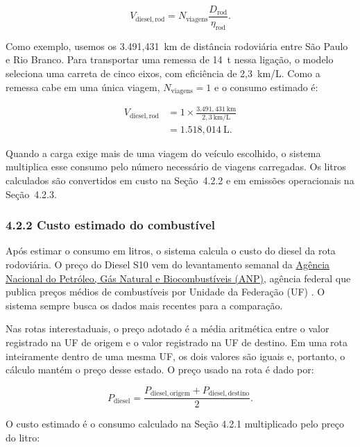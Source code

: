 \documentclass[brazil,]{article}
\let\oldsubsubsection\subsubsection
\renewcommand{\subsubsection}{\Needspace{10\baselineskip}\oldsubsubsection}
\newcommand{\keepcalculation}{\Needspace{12\baselineskip}}
\begin{document}
\[
V_{\mathrm{diesel,rod}}
=N_{\mathrm{viagens}}\frac{D_{\mathrm{rod}}}{\eta_{\mathrm{rod}}}.
\]

\keepcalculation
Como exemplo, usemos os 3.491,431~km de distância rodoviária entre São
Paulo e Rio Branco. Para transportar uma remessa de 14~t nessa ligação,
o modelo seleciona uma carreta de cinco eixos, com eficiência de
2,3~km/L. Como a remessa cabe em uma única viagem,
\(N_{\mathrm{viagens}}=1\) e o consumo estimado é:

\[
\begin{aligned}
V_{\mathrm{diesel,rod}}
&=1\times\frac{3.491{,}431\ \mathrm{km}}{2{,}3\ \mathrm{km/L}}\\
&=1.518{,}014\ \mathrm{L}.
\end{aligned}
\]

Quando a carga exige mais de uma viagem do veículo escolhido, o sistema
multiplica esse consumo pelo número necessário de viagens carregadas. Os
litros calculados são convertidos em custo na Seção~4.2.2 e em emissões
operacionais na Seção~4.2.3.

\hypertarget{custo-estimado-do-combustuxedvel}{%
\subsubsection{4.2.2 Custo estimado do
combustível}\label{custo-estimado-do-combustuxedvel}}

Após estimar o consumo em litros, o sistema calcula o custo do diesel da
rota rodoviária. O preço do Diesel S10 vem do levantamento semanal da
\href{https://www.gov.br/anp/pt-br/assuntos/precos-e-defesa-da-concorrencia/precos/levantamento-de-precos-de-combustiveis-ultimas-semanas-pesquisadas}{Agência
Nacional do Petróleo, Gás Natural e Biocombustíveis (ANP)}, agência
federal que publica preços médios de combustíveis por Unidade da
Federação (UF) \parencite{anp2026}. O sistema sempre busca os dados mais recentes para a
comparação.

Nas rotas interestaduais, o preço adotado é a média aritmética entre o
valor registrado na UF de origem e o valor registrado na UF de destino.
Em uma rota inteiramente dentro de uma mesma UF, os dois valores são
iguais e, portanto, o cálculo mantém o preço desse estado. O preço usado
na rota é dado por:

\[
P_{\mathrm{diesel}}
=\frac{P_{\mathrm{diesel,origem}}+P_{\mathrm{diesel,destino}}}{2}.
\]

O custo estimado é o consumo calculado na Seção 4.2.1 multiplicado pelo
preço do litro:
\end{document}
